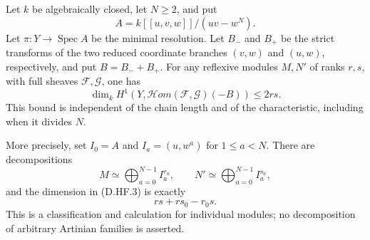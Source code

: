 \begin{proposition}
\label{D:A-chain-two-end-Hom-bound}
Let $k$ be algebraically closed, let $N\ge2$, and put
\[
       A=k[[u,v,w]]/(uv-w^N).
\]
Let $\pi:Y\to\operatorname{Spec}A$ be the minimal resolution.
Let $B_-$ and $B_+$ be the strict transforms of the two reduced
coordinate branches $(v,w)$ and $(u,w)$, respectively, and put
$B=B_-+B_+$. For any reflexive modules $M,N'$ of ranks $r,s$,
with full sheaves $\mathcal F,\mathcal G$, one has
\[
 \dim_kH^1(Y,\mathcal Hom(\mathcal F,\mathcal G)(-B))
                         \le2rs.                      \tag{D.HF.3}
\]
This bound is independent of the chain length and of the
characteristic, including when it divides $N$.

More precisely, set $I_0=A$ and $I_a=(u,w^a)$ for $1\le a<N$.
There are decompositions
\[
 M\simeq\bigoplus_{a=0}^{N-1}I_a^{r_a},\qquad
 N'\simeq\bigoplus_{a=0}^{N-1}I_a^{s_a},
\]
and the dimension in (D.HF.3) is exactly
\[
                          rs+r s_0-r_0s.               \tag{D.HF.4}
\]
This is a classification and calculation for individual modules;
no decomposition of arbitrary Artinian families is asserted.
\end{proposition}
